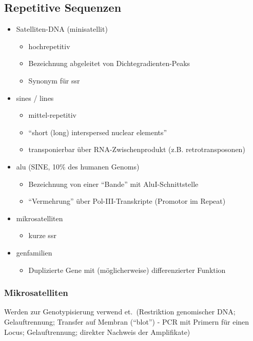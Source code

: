 \subsection{Repetitive Sequenzen}\label{subsec:repetitive-sequenzen}
\begin{itemize}
    \item Satelliten-DNA (\gls{minisatellit})
    \begin{itemize}
        \item hochrepetitiv
        \item Bezeichnung abgeleitet von Dichtegradienten-Peaks
        \item Synonym für \gls{ssr}
    \end{itemize}
    \item \glspl{sine} / \glspl{line}
    \begin{itemize}
        \item mittel-repetitiv
        \item “short (long) interspersed nuclear elements”
        \item transponierbar über RNA-Zwischenprodukt (z.B. \gls{retrotransposon}en)
    \end{itemize}
    \item \gls{alu} (SINE, 10\% des humanen Genoms)
    \begin{itemize}
        \item Bezeichnung von einer ``Bande'' mit AluI-Schnittstelle
        \item ``Vermehrung'' über Pol-III-Transkripte (Promotor im Repeat)
    \end{itemize}
    \item \gls{mikrosatellit}en
    \begin{itemize}
        \item kurze \gls{ssr}
    \end{itemize}
    \item \gls{genfamilie}n
    \begin{itemize}
        \item Duplizierte Gene mit (möglicherweise) differenzierter Funktion
    \end{itemize}
\end{itemize}


\subsubsection{Mikrosatelliten}
Werden zur Genotypisierung verwend et.\ (Restriktion genomischer DNA;
Gelauftrennung;
Transfer auf Membran (``blot'') - PCR mit Primern für einen Locus;
Gelauftrennung;
direkter Nachweis der Amplifikate)



